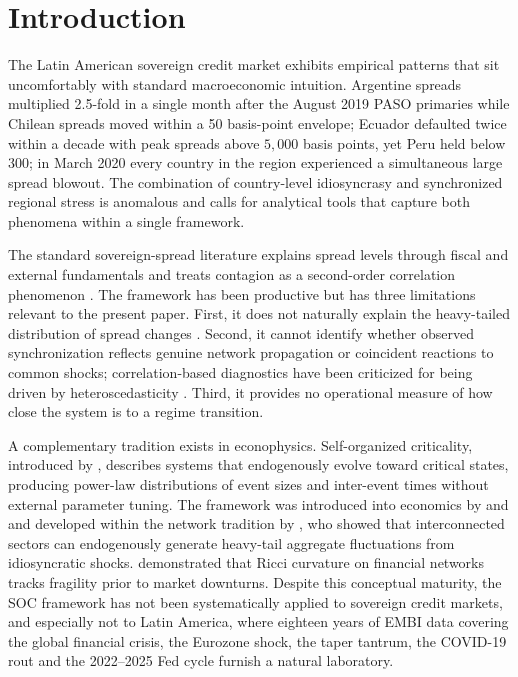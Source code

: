 \documentclass[12pt,a4paper]{article}
\begin{document}
\section{Introduction}
\label{sec:intro}

The Latin American sovereign credit market exhibits empirical patterns that
sit uncomfortably with standard macroeconomic intuition. Argentine spreads
multiplied 2.5-fold in a single month after the August 2019 PASO primaries
while Chilean spreads moved within a 50 basis-point envelope; Ecuador
defaulted twice within a decade with peak spreads above $5{,}000$ basis points,
yet Peru held below $300$; in March 2020 every country in the region
experienced a simultaneous large spread blowout. The combination of
country-level idiosyncrasy and synchronized regional stress is anomalous and
calls for analytical tools that capture both phenomena within a single
framework.

The standard sovereign-spread literature explains spread levels through
fiscal and external fundamentals \citep{Edwards1984, EichengreenMody1998,
Longstaff2011, Hilscher2010} and treats contagion as a second-order
correlation phenomenon \citep{ForbesRigobon2002, KaminskyReinhart2000,
KaminskyReinhartVegh2003}. The framework has been productive but has three
limitations relevant to the present paper. First, it does not naturally
explain the heavy-tailed distribution of spread changes
\citep{Mandelbrot1963, Gabaix2009}. Second, it cannot identify whether
observed synchronization reflects genuine network propagation or coincident
reactions to common shocks; correlation-based diagnostics have been criticized
for being driven by heteroscedasticity \citep{ForbesRigobon2002}. Third, it
provides no operational measure of how close the system is to a regime
transition.

A complementary tradition exists in econophysics. Self-organized criticality,
introduced by \citet{BTW1987, BTW1988}, describes systems that endogenously
evolve toward critical states, producing power-law distributions of event
sizes and inter-event times without external parameter tuning. The framework
was introduced into economics by \citet{Bak1993} and \citet{Scheinkman1994}
and developed within the network tradition by \citet{Acemoglu2012}, who
showed that interconnected sectors can endogenously generate heavy-tail
aggregate fluctuations from idiosyncratic shocks. \citet{Sandhu2016}
demonstrated that Ricci curvature on financial networks tracks fragility
prior to market downturns. Despite this conceptual maturity, the SOC
framework has not been systematically applied to sovereign credit markets,
and especially not to Latin America, where eighteen years of EMBI data
covering the global financial crisis, the Eurozone shock, the taper tantrum,
the COVID-19 rout and the 2022--2025 Fed cycle furnish a natural laboratory.
\end{document}
